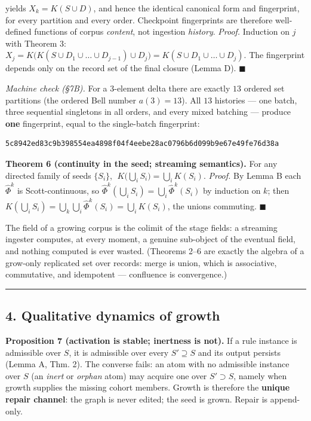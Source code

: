 \documentclass[
  10pt,
]{article}
\begin{document}
yields \(X_k = K(S \cup D)\), and hence the identical canonical form and
fingerprint, for every partition and every order. Checkpoint
fingerprints are therefore well-defined functions of corpus
\emph{content}, not ingestion \emph{history}. \emph{Proof.} Induction on
\(j\) with Theorem 3:
\(X_j = K\big(K(S \cup D_1 \cup \dots \cup D_{j-1}) \cup D_j\big) = K(S \cup D_1 \cup \dots \cup D_j)\).
The fingerprint depends only on the record set of the final closure
(Lemma D). \(\blacksquare\)

\emph{Machine check (§7B).} For a 3-element delta there are exactly
\(13\) ordered set partitions (the ordered Bell number \(a(3) = 13\)).
All \(13\) histories --- one batch, three sequential singletons in all
orders, and every mixed batching --- produce \textbf{one} fingerprint,
equal to the single-batch fingerprint:

\begin{verbatim}
5c8942ed83c9b398554ea4898f04f4eebe28ac0796b6d099b9e67e49fe76d38a
\end{verbatim}

\textbf{Theorem 6 (continuity in the seed; streaming semantics).} For
any directed family of seeds \(\{S_i\}\),
\(\;K\big(\bigcup_i S_i\big) = \bigcup_i K(S_i)\). \emph{Proof.} By
Lemma B each \(\hat\Phi^k\) is Scott-continuous, so
\(\hat\Phi^k(\bigcup_i S_i) = \bigcup_i \hat\Phi^k(S_i)\) by induction
on \(k\); then
\(K(\bigcup_i S_i) = \bigcup_k \bigcup_i \hat\Phi^k(S_i) = \bigcup_i K(S_i)\),
the unions commuting. \(\blacksquare\)

The field of a growing corpus is the colimit of the stage fields: a
streaming ingester computes, at every moment, a genuine sub-object of
the eventual field, and nothing computed is ever wasted. (Theorems 2--6
are exactly the algebra of a grow-only replicated set over records:
merge is union, which is associative, commutative, and idempotent ---
confluence is convergence.)

\begin{center}\rule{0.5\linewidth}{0.5pt}\end{center}

\hypertarget{qualitative-dynamics-of-growth}{%
\subsection{4. Qualitative dynamics of
growth}\label{qualitative-dynamics-of-growth}}

\textbf{Proposition 7 (activation is stable; inertness is not).} If a
rule instance is admissible over \(S\), it is admissible over every
\(S' \supseteq S\) and its output persists (Lemma A, Thm. 2). The
converse fails: an atom with no admissible instance over \(S\) (an
\emph{inert} or \emph{orphan} atom) may acquire one over
\(S' \supset S\), namely when growth supplies the missing cohort
members. Growth is therefore the \textbf{unique repair channel}: the
graph is never edited; the seed is grown. Repair is append-only.
\end{document}
